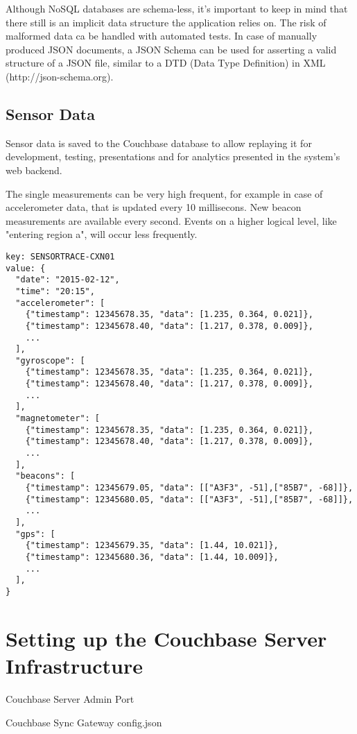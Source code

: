 Although NoSQL databases are schema-less, it's important to keep in mind that there still is an implicit data structure the application relies on. The risk of malformed data ca be handled with automated tests. In case of manually produced JSON documents, a JSON Schema can be used for asserting a valid structure of a JSON file, similar to a DTD (Data Type Definition) in XML (http://json-schema.org).

\subsection{Sensor Data}

Sensor data is saved to the Couchbase database to allow replaying it for development, testing, presentations and for analytics presented in the system's web backend. 

The single measurements can be very high frequent, for example in case of accelerometer data, that is updated every 10 millisecons. New beacon measurements are available every second. Events on a higher logical level, like "entering region a", will occur less frequently.

\begin{lstlisting}[basicstyle=\footnotesize]
key: SENSORTRACE-CXN01
value: {
  "date": "2015-02-12",
  "time": "20:15",
  "accelerometer": [
    {"timestamp": 12345678.35, "data": [1.235, 0.364, 0.021]},
    {"timestamp": 12345678.40, "data": [1.217, 0.378, 0.009]},
    ...
  ],
  "gyroscope": [
    {"timestamp": 12345678.35, "data": [1.235, 0.364, 0.021]},
    {"timestamp": 12345678.40, "data": [1.217, 0.378, 0.009]},
    ...
  ],
  "magnetometer": [
    {"timestamp": 12345678.35, "data": [1.235, 0.364, 0.021]},
    {"timestamp": 12345678.40, "data": [1.217, 0.378, 0.009]},
    ...
  ],
  "beacons": [
    {"timestamp": 12345679.05, "data": [["A3F3", -51],["85B7", -68]]},
    {"timestamp": 12345680.05, "data": [["A3F3", -51],["85B7", -68]]},
    ...
  ],
  "gps": [
    {"timestamp": 12345679.35, "data": [1.44, 10.021]},
    {"timestamp": 12345680.36, "data": [1.44, 10.009]},
    ...
  ],
}
\end{lstlisting}


\section{Setting up the Couchbase Server Infrastructure}

Couchbase Server
Admin Port

Couchbase Sync Gateway
config.json

